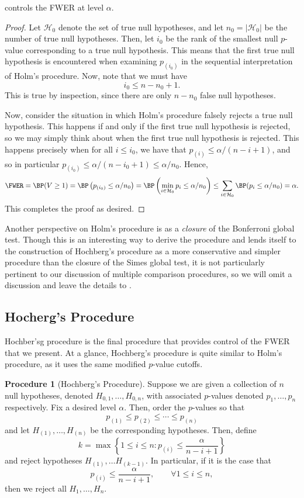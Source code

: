 \documentclass[11pt,reqno]{report}
\theoremstyle{definition}
\newtheorem{proc}[theorem]{Procedure}
\numberwithin{equation}{section}
\begin{document}
\begin{prop}
 controls the FWER at level $\alpha$.
\end{prop}
\begin{proof}
Let $\mathcal{H}_0$ denote the set of true null hypotheses, and let $n_0 = |\mathcal{H}_0|$ be the number of true null hypotheses. Then, let $i_0$ be the rank of the smallest null $p$-value corresponding to a true null hypothesis. This means that the first true null hypothesis is encountered when examining $p_{(i_0)}$ in the sequential interpretation of Holm's procedure. Now, note that we must have
\[ i_0 \leq n - n_0 + 1. \] This is true by inspection, since there are only $n - n_0$ false null hypotheses.

Now, consider the situation in which Holm's procedure falsely rejects a true null hypothesis. This happens if and only if the first true null hypothesis is rejected, so we may simply think about when the first true null hypothesis is rejected. This happens precisely when for all $i \leq i_0$, we have that $p_{(i)} \leq \alpha / (n - i + 1)$, and so in particular $p_{(i_0)} \leq \alpha / (n - i_0 + 1) \leq \alpha / n_0$. Hence,
\[ \FWER = \BP(V \geq 1) = \BP\left( p_{(i_0)} \leq \alpha / n_0 \right) = \BP\left( \min_{i \in \mathcal{H}_0} p_{i} \leq \alpha / n_0 \right) \leq \sum_{i \in \mathcal{H}_0} \BP(p_{i} \leq \alpha / n_0)  = \alpha. \]
This completes the proof as desired.
\end{proof}

\begin{note*}
Another perspective on Holm's procedure is as a \emph{closure} of the Bonferroni global test. Though this is an interesting way to derive the procedure and lends itself to the construction of Hochberg's procedure as a more conservative and simpler procedure than the closure of the Simes global test, it is not particularly pertinent to our discussion of multiple comparison procedures, so we will omit a discussion and leave the details to \cite{stat300}.
\end{note*}

\subsection{Hocherg's Procedure}
Hochber'sg procedure is the final procedure that provides control of the FWER that we present. At a glance, Hochberg's procedure is quite similar to Holm's procedure, as it uses the same modified $p$-value cutoffs.
\begin{proc}[Hochberg's Procedure]
\label{hochproc}
Suppose we are given a collection of $n$ null hypotheses, denoted $H_{0, 1}, \ldots, H_{0, n}$, with associated $p$-values denoted $p_1, \ldots, p_n$ respectively. Fix a desired level $\alpha$. Then, order the $p$-values so that
\[ p_{(1)} \leq p_{(2)} \leq \cdots \leq p_{(n)} \] and let $H_{(1)}, \ldots, H_{(n)}$ be the corresponding hypotheses. Then, define
\[ k = \max \left\{ 1 \leq i \leq n : p_{(i)} \leq \frac{\alpha}{n - i + 1} \right \}  \] and reject hypotheses $H_{(1)}, \ldots H_{(k-1)}$. In particular, if it is the case that 
\[ p_{(i)} \leq \frac{\alpha}{n - i + 1}, \qquad \forall 1 \leq i \leq n, \] then we reject all $H_1, \ldots, H_n$.
\end{proc}
\end{document}
